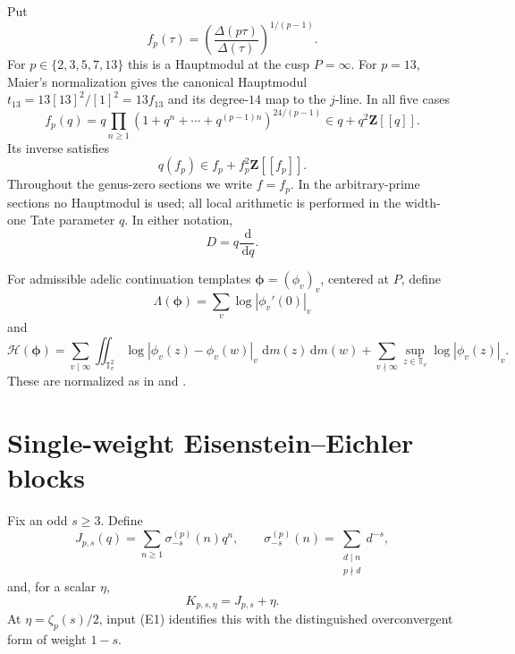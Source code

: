 \documentclass[11pt]{article}
\theoremstyle{definition}
\theoremstyle{remark}
\newcommand{\Z}{\mathbf Z}
\newcommand{\dd}{\,\mathrm d}
\newcommand{\Energy}{\mathscr H}
\newcommand{\LambdaAH}{\Lambda}
\newcommand{\abs}[1]{\left|#1\right|}
\newcommand{\T}{\mathbb T}
\begin{document}
Put
\begin{equation}\label{eq:f}
 f_p(\tau)=\left(\frac{\Delta(p\tau)}{\Delta(\tau)}\right)^{1/(p-1)}.
\end{equation}
For $p\in\{2,3,5,7,13\}$ this is a Hauptmodul at the cusp
$P=\infty$.  For $p=13$, Maier's normalization \cite[(3.2) and Table~4]{Maier2009}
gives the canonical Hauptmodul
$t_{13}=13[13]^2/[1]^2=13f_{13}$ and its degree-$14$ map to the
$j$-line.  In all five
cases
\begin{equation}\label{eq:f-product}
 f_p(q)=q\prod_{n\ge1}
 \left(1+q^n+\cdots+q^{(p-1)n}\right)^{24/(p-1)}
 \in q+q^2\Z[[q]].
\end{equation}
Its inverse satisfies
\begin{equation}\label{eq:q-inverse}
 q(f_p)\in f_p+f_p^2\Z[[f_p]].
\end{equation}
Throughout the genus-zero sections we write $f=f_p$.  In the
arbitrary-prime sections no Hauptmodul is used; all local arithmetic is
performed in the width-one Tate parameter $q$.  In either notation,
\[
 D=q\frac{\dd}{\dd q}.
\]

For admissible adelic continuation templates
$\boldsymbol\phi=(\phi_v)_v$, centered at $P$, define
\begin{equation}\label{eq:Lambda}
 \LambdaAH(\boldsymbol\phi)=\sum_v\log\abs{\phi_v'(0)}_v
\end{equation}
and
\begin{equation}\label{eq:Energy}
 \Energy(\boldsymbol\phi)=
 \sum_{v\mid\infty}\iint_{\T_v^2}
 \log\abs{\phi_v(z)-\phi_v(w)}_v\,\dd m(z)\dd m(w)
 +\sum_{v\nmid\infty}\sup_{z\in\T_v}\log\abs{\phi_v(z)}_v.
\end{equation}
These are normalized as in \cite[Section~7.3]{CDT2024} and
\cite[Section~2]{CDT2025}.

\section{Single-weight Eisenstein--Eichler blocks}\label{sec:blocks}

Fix an odd $s\ge3$.  Define
\begin{equation}\label{eq:J-def}
 J_{p,s}(q)=\sum_{n\ge1}\sigma_{-s}^{(p)}(n)q^n,
 \qquad
 \sigma_{-s}^{(p)}(n)=\sum_{\substack{d\mid n\\p\nmid d}}d^{-s},
\end{equation}
and, for a scalar $\eta$,
\[
 K_{p,s,\eta}=J_{p,s}+\eta.
\]
At $\eta=\zeta_p(s)/2$, input (E1) identifies this with the distinguished
overconvergent form of weight $1-s$.
\end{document}
